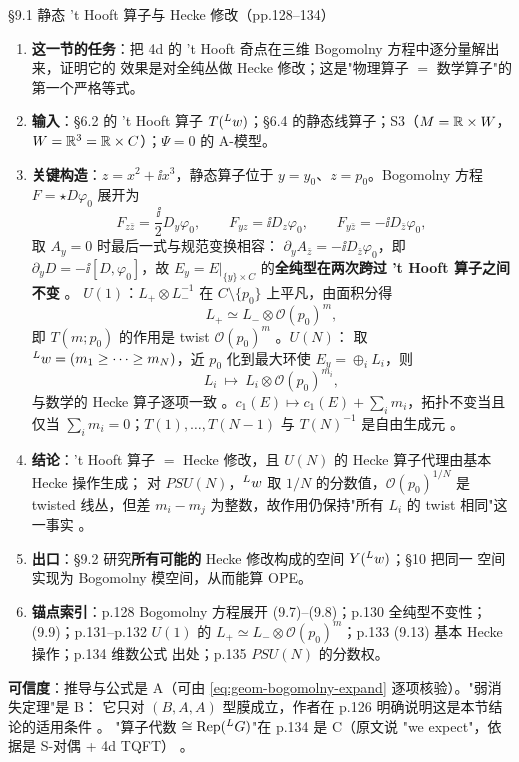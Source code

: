 \begin{kcard}{\S9.1 静态 't Hooft 算子与 Hecke 修改（pp.128--134）}
\begin{enumerate}[label=\textbf{\arabic*}]
\item \textbf{这一节的任务}：把 4d 的 't Hooft 奇点在三维 Bogomolny 方程中逐分量解出来，证明它的
  效果是对全纯丛做 Hecke 修改；这是"物理算子 $=$ 数学算子"的第一个严格等式。
\item \textbf{输入}：\S6.2 的 't Hooft 算子 $T({}^{L}w)$；\S6.4 的静态线算子；S3（$M=\mathbb{R}\times W$，
  $W=\mathbb{R}^3=\mathbb{R}\times C$）；$\Psi=0$ 的 A-模型。
\item \textbf{关键构造}：$z=x^2+\ii x^3$，静态算子位于 $y=y_0$、$z=p_0$。Bogomolny 方程
  $F=\star D\varphi_0$ 展开为
\begin{equation}
F_{z\bar z}=\frac{\ii}{2}D_y\varphi_0,\qquad
F_{yz}=\ii D_z\varphi_0,\qquad
F_{y\bar z}=-\ii D_{\bar z}\varphi_0 ,
\label{eq:geom-bogomolny-expand}
\end{equation}
  取 $A_y=0$ 时最后一式与规范变换相容：
  $\partial_yA_{\bar z}=-\ii D_{\bar z}\varphi_0$，即 $\partial_yD=-\ii[D,\varphi_0]$，故
  $E_y=E|_{\{y\}\times C}$ 的\textbf{全纯型在两次跨过 't Hooft 算子之间不变} \pA{}。
  $U(1)$：$L_+\otimes L_-^{-1}$ 在 $C\setminus\{p_0\}$ 上平凡，由面积分得
\begin{equation}
L_+\simeq L_-\otimes\mathcal O(p_0)^m ,
\label{eq:geom-hecke-u1}
\end{equation}
  即 $T(m;p_0)$ 的作用是 twist $\mathcal O(p_0)^m$ \pA{}。$U(N)$：
  取 ${}^{L}w=(m_1\ge\cdots\ge m_N)$，近 $p_0$ 化到最大环使 $E_y=\oplus_iL_i$，则
\begin{equation}
L_i\ \longmapsto\ L_i\otimes\mathcal O(p_0)^{m_i},
\label{eq:geom-hecke-un}
\end{equation}
  与数学的 Hecke 算子逐项一致 \pA{}。$c_1(E)\mapsto c_1(E)+\sum_im_i$，拓扑不变当且
  仅当 $\sum_im_i=0$；$T(1),\dots,T(N-1)$ 与 $T(N)^{-1}$ 是自由生成元 \pA{}。
\item \textbf{结论}：'t Hooft 算子 $=$ Hecke 修改，且 $U(N)$ 的 Hecke 算子代理由基本 Hecke 操作生成；
  对 $PSU(N)$，${}^{L}w$ 取 $1/N$ 的分数值，$\mathcal O(p_0)^{1/N}$ 是 twisted 线丛，但差
  $m_i-m_j$ 为整数，故作用仍保持"所有 $L_i$ 的 twist 相同"这一事实 \pA{}。
\item \textbf{出口}：\S9.2 研究\textbf{所有可能的} Hecke 修改构成的空间 $Y({}^{L}w)$；\S10 把同一
  空间实现为 Bogomolny 模空间，从而能算 OPE。
\item \textbf{锚点索引}：p.128 Bogomolny 方程展开 (9.7)--(9.8)；p.130 全纯型不变性；(9.9)；p.131--p.132
  $U(1)$ 的 $L_+\simeq L_-\otimes\mathcal O(p_0)^m$；p.133 (9.13) 基本 Hecke 操作；p.134 维数公式
  出处；p.135 $PSU(N)$ 的分数权。
\end{enumerate}
\textbf{可信度}：推导与公式是 A（可由 \eqref{eq:geom-bogomolny-expand} 逐项核验）。"弱消失定理"是 B：
它只对 $(B,A,A)$ 型膜成立，作者在 p.126 明确说明这是本节结论的适用条件 \pB{}。
"算子代数 $\cong\mathrm{Rep}({}^{L}G)$"在 p.134 是 C（原文说 "we expect"，依据是 S-对偶 + 4d TQFT）
\pC{}。
\end{kcard}

